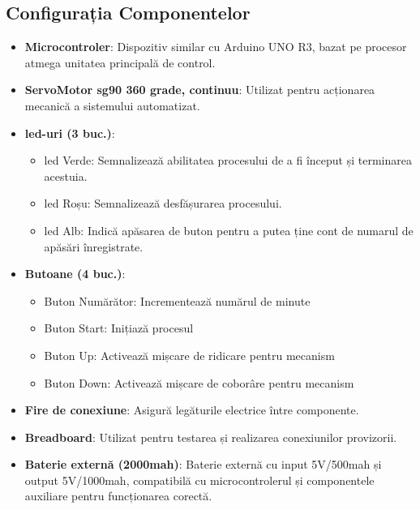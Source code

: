     \subsection{Configurația Componentelor}
        \begin{itemize}
            \item \textbf{Microcontroler}:  
            Dispozitiv similar cu Arduino UNO R3, %
            bazat pe procesor \gls{atmega} %
            unitatea principală de control. 
            
            \item \textbf{ServoMotor \gls{sg90} 360 grade, continuu}:  
            Utilizat pentru acționarea mecanică a %
            sistemului automatizat.   
    
            \item \textbf{\gls{led}-uri (3 buc.)}:  
              \begin{itemize}
                  \item \gls{led} Verde: Semnalizează abilitatea procesului %
                  de a fi început și terminarea acestuia.  
                  \item \gls{led} Roșu: Semnalizează desfășurarea procesului.  
                  \item \gls{led} Alb: Indică apăsarea de buton pentru a putea %
                  ține cont de numarul de apăsări înregistrate.  
              \end{itemize}
    
            \item \textbf{Butoane (4 buc.)}:  
            \begin{itemize}
              \item Buton Numărător: Incrementează numărul de minute  
              \item Buton Start: Inițiază procesul   
              \item Buton Up: Activează mișcare de ridicare %
              pentru mecanism
              \item Buton Down: Activează mișcare de coborâre %
              pentru mecanism
            \end{itemize}
    
            \item \textbf{Fire de conexiune}:  
            Asigură legăturile electrice între componente.  
    
            \item \textbf{Breadboard}:  
            Utilizat pentru testarea și realizarea conexiunilor provizorii.  
    
            \item \textbf{Baterie externă (2000\gls{mah})}:  
            Baterie externă  cu input 5V/500\gls{mah} și output 5V/1000\gls{mah}, %
            compatibilă cu microcontrolerul și %
            componentele auxiliare pentru funcționarea %
            corectă.   
    \end{itemize}
    



